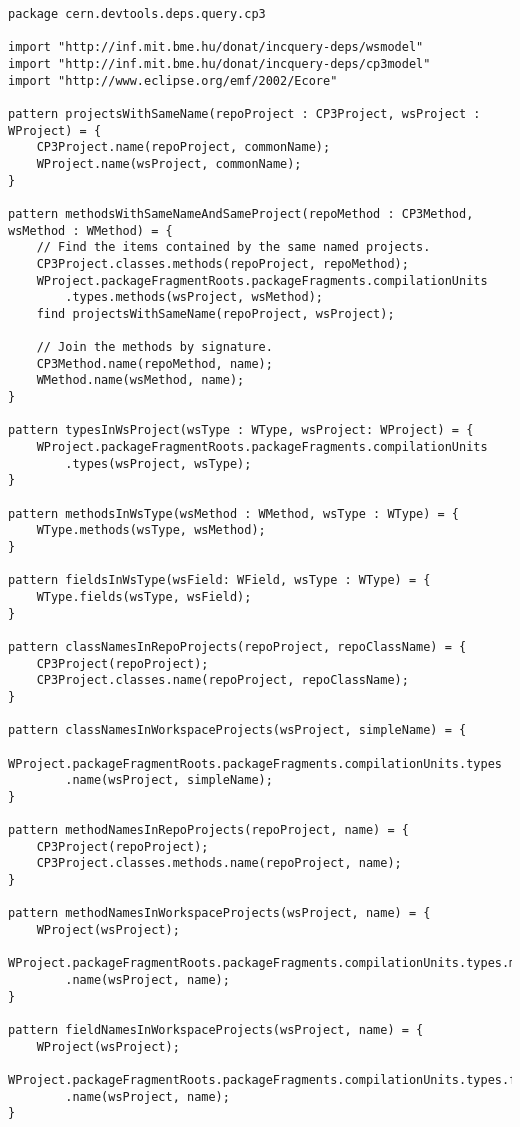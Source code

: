 \begin{lstlisting}
package cern.devtools.deps.query.cp3

import "http://inf.mit.bme.hu/donat/incquery-deps/wsmodel"
import "http://inf.mit.bme.hu/donat/incquery-deps/cp3model"
import "http://www.eclipse.org/emf/2002/Ecore"

pattern projectsWithSameName(repoProject : CP3Project, wsProject : WProject) = {
    CP3Project.name(repoProject, commonName);
    WProject.name(wsProject, commonName);
}

pattern methodsWithSameNameAndSameProject(repoMethod : CP3Method, wsMethod : WMethod) = { 
	// Find the items contained by the same named projects.
    CP3Project.classes.methods(repoProject, repoMethod);
    WProject.packageFragmentRoots.packageFragments.compilationUnits
    	.types.methods(wsProject, wsMethod);
    find projectsWithSameName(repoProject, wsProject);

    // Join the methods by signature.
    CP3Method.name(repoMethod, name);
    WMethod.name(wsMethod, name);
}

pattern typesInWsProject(wsType : WType, wsProject: WProject) = {
    WProject.packageFragmentRoots.packageFragments.compilationUnits
    	.types(wsProject, wsType);
}

pattern methodsInWsType(wsMethod : WMethod, wsType : WType) = {
    WType.methods(wsType, wsMethod);    
}

pattern fieldsInWsType(wsField: WField, wsType : WType) = {
    WType.fields(wsType, wsField);    
}

pattern classNamesInRepoProjects(repoProject, repoClassName) = {
    CP3Project(repoProject);
    CP3Project.classes.name(repoProject, repoClassName);
}

pattern classNamesInWorkspaceProjects(wsProject, simpleName) = {
    WProject.packageFragmentRoots.packageFragments.compilationUnits.types
    	.name(wsProject, simpleName);
}

pattern methodNamesInRepoProjects(repoProject, name) = {
    CP3Project(repoProject);
    CP3Project.classes.methods.name(repoProject, name);
}

pattern methodNamesInWorkspaceProjects(wsProject, name) = {
    WProject(wsProject);
    WProject.packageFragmentRoots.packageFragments.compilationUnits.types.methods
    	.name(wsProject, name);
}

pattern fieldNamesInWorkspaceProjects(wsProject, name) = {
    WProject(wsProject);
    WProject.packageFragmentRoots.packageFragments.compilationUnits.types.fields
    	.name(wsProject, name);
}


\end{lstlisting}
